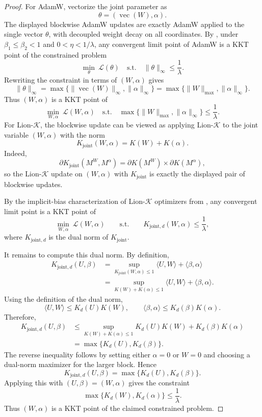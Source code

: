 \documentclass{article}
\begin{document}
\begin{proof}
    For AdamW, vectorize the joint parameter as
\[
    \theta=(\operatorname{vec}(W),\alpha).
\]
The displayed blockwise AdamW updates are exactly AdamW applied to the
single vector $\theta$, with decoupled weight decay on all coordinates. By
\citet[Theorem~1.1]{xie2024implicitbiasadamwellinfty}, under
$\beta_1\le \beta_2<1$ and $0<\eta<1/\lambda$, any convergent limit point
of AdamW is a KKT point of the constrained problem
\[
    \min_\theta\ \mathcal L(\theta)
    \quad
    \mathrm{s.t.}
    \quad
    \|\theta\|_\infty\le \frac1\lambda .
\]
Rewriting the constraint in terms of $(W,\alpha)$ gives
\[
    \|\theta\|_\infty
    =
    \max\{\|\operatorname{vec}(W)\|_\infty,\|\alpha\|_\infty\}
    =
    \max\{\|W\|_{\max},\|\alpha\|_\infty\}.
\]
Thus $(W,\alpha)$ is a KKT point of
\[
    \min_{W,\alpha}\ \mathcal L(W,\alpha)
    \quad
    \mathrm{s.t.}
    \quad
    \max\{\|W\|_{\max},\|\alpha\|_\infty\}
    \le \frac1\lambda .
\]
For Lion-$\mathcal K$, the blockwise update can be viewed as applying
Lion-$\mathcal K$ to the joint variable $(W,\alpha)$ with the norm
\[
    K_{\mathrm{joint}}(W,\alpha)=K(W)+K(\alpha).
\]
Indeed,
\[
    \partial K_{\mathrm{joint}}(M^W,M^\alpha)
    =
    \partial K(M^W)\times \partial K(M^\alpha),
\]
so the Lion-$\mathcal K$ update on $(W,\alpha)$ with
$K_{\mathrm{joint}}$ is exactly the displayed pair of blockwise updates.

By the implicit-bias characterization of Lion-$\mathcal K$ optimizers
from \citep{chen2025muonoptimizesspectralnorm}, any convergent limit point is a KKT point of
\[
    \min_{W,\alpha}\ \mathcal L(W,\alpha)
    \qquad
    \mathrm{s.t.}
    \qquad
    K_{\mathrm{joint},d}(W,\alpha)\le \frac1\lambda ,
\]
where $K_{\mathrm{joint},d}$ is the dual norm of $K_{\mathrm{joint}}$.

It remains to compute this dual norm. By definition,
\[
\begin{aligned}
K_{\mathrm{joint},d}(U,\beta)
&=
\sup_{K_{\mathrm{joint}}(W,\alpha)\le 1}
\langle U,W\rangle+\langle \beta,\alpha\rangle \\
&=
\sup_{K(W)+K(\alpha)\le 1}
\langle U,W\rangle+\langle \beta,\alpha\rangle .
\end{aligned}
\]
Using the definition of the dual norm,
\[
    \langle U,W\rangle\le K_d(U)K(W),
    \qquad
    \langle \beta,\alpha\rangle\le K_d(\beta)K(\alpha).
\]
Therefore,
\[
\begin{aligned}
K_{\mathrm{joint},d}(U,\beta)
&\le
\sup_{K(W)+K(\alpha)\le 1}
K_d(U)K(W)+K_d(\beta)K(\alpha) \\
&=
\max\{K_d(U),K_d(\beta)\}.
\end{aligned}
\]
The reverse inequality follows by setting either $\alpha=0$ or $W=0$ and
choosing a dual-norm maximizer for the larger block. Hence
\[
    K_{\mathrm{joint},d}(U,\beta)
    =
    \max\{K_d(U),K_d(\beta)\}.
\]
Applying this with $(U,\beta)=(W,\alpha)$ gives the constraint
\[
    \max\{K_d(W),K_d(\alpha)\}\le \frac1\lambda .
\]
Thus $(W,\alpha)$ is a KKT point of the claimed constrained problem.


\end{proof}
\end{document}

